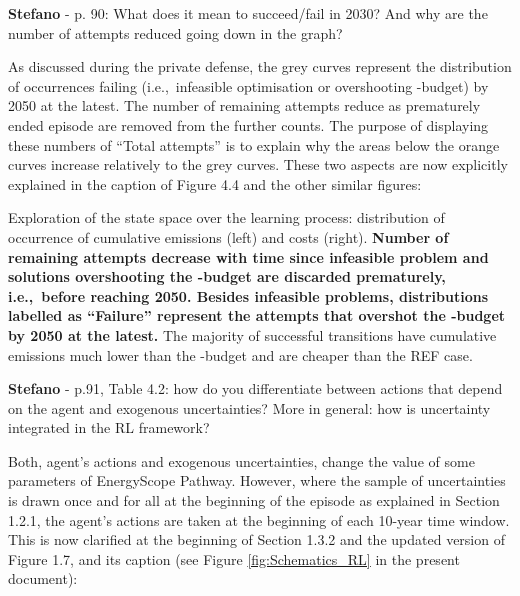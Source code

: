 \documentclass[12pt,a4paper]{article}
\def\ie{i.e.,\ }
\begin{document}
\begin{mdframed}[style=comment] %
{\color{orange} \textbf{Stefano}} - p. 90: What does it mean to succeed/fail in 2030? And why are the number of attempts reduced going down in the graph?
\end{mdframed}

\noindent As discussed during the private defense, the grey curves represent the distribution of occurrences failing (\ie infeasible optimisation or overshooting -budget) by 2050 at the latest. The number of remaining attempts reduce as prematurely ended episode are removed from the further counts. The purpose of displaying these numbers of ``Total attempts'' is to explain why the areas below the orange curves increase relatively to the grey curves. These two aspects are now explicitly explained {\color{blue}in the caption of Figure 4.4 and the other similar figures}:

\begin{mdframed}[style=manuscript] %
Exploration of the state space over the learning process: distribution of occurrence of cumulative emissions (left) and costs (right). \textbf{Number of remaining attempts decrease with time since infeasible problem and solutions overshooting the -budget are discarded prematurely, \ie before reaching 2050. Besides infeasible problems, distributions labelled as ``Failure'' represent the attempts that overshot the -budget by 2050 at the latest.} The majority of successful transitions have cumulative emissions much lower than the -budget and are cheaper than the REF case. 
\end{mdframed}

\begin{mdframed}[style=comment] %
{\color{orange} \textbf{Stefano}} - p.91, Table 4.2: how do you differentiate between actions that depend on the agent and exogenous uncertainties? More in general: how is uncertainty integrated in the RL framework?
\end{mdframed}

\noindent Both, agent's actions and exogenous uncertainties, change the value of some parameters of EnergyScope Pathway. However, where the sample of uncertainties is drawn once and for all at the beginning of the episode as explained in Section 1.2.1, the agent's actions are taken at the beginning of each 10-year time window. This is now clarified {\color{blue}at the beginning of Section 1.3.2 and the updated version of Figure 1.7, and its caption} (see Figure \ref{fig:Schematics_RL} in the present document):
\end{document}
